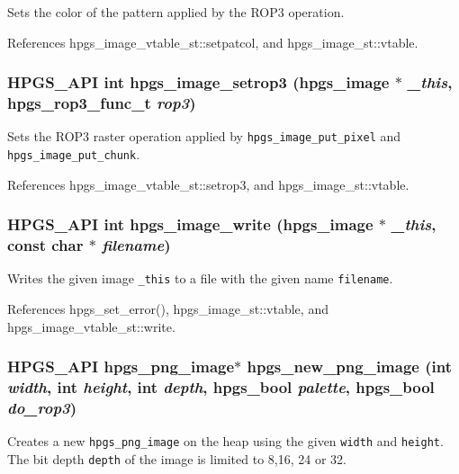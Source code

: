 Sets the color of the pattern applied by the ROP3 operation. 

References hpgs\_\-image\_\-vtable\_\-st::setpatcol, and hpgs\_\-image\_\-st::vtable.
\subsubsection[hpgs\_\-image\_\-setrop3]{\setlength{\rightskip}{0pt plus 5cm}HPGS\_\-API int hpgs\_\-image\_\-setrop3 ({\bf hpgs\_\-image} $\ast$ {\em \_\-this}, \/  hpgs\_\-rop3\_\-func\_\-t {\em rop3})}\label{group__image_g34ad39852d133cb855c6d315c2eb48eb}


Sets the ROP3 raster operation applied by {\tt hpgs\_\-image\_\-put\_\-pixel} and {\tt hpgs\_\-image\_\-put\_\-chunk}. 

References hpgs\_\-image\_\-vtable\_\-st::setrop3, and hpgs\_\-image\_\-st::vtable.
\subsubsection[hpgs\_\-image\_\-write]{\setlength{\rightskip}{0pt plus 5cm}HPGS\_\-API int hpgs\_\-image\_\-write ({\bf hpgs\_\-image} $\ast$ {\em \_\-this}, \/  const char $\ast$ {\em filename})}\label{group__image_g3c87359a79f9da67a3a541cb4cb63c76}


Writes the given image {\tt \_\-this} to a file with the given name {\tt filename}. 

References hpgs\_\-set\_\-error(), hpgs\_\-image\_\-st::vtable, and hpgs\_\-image\_\-vtable\_\-st::write.
\subsubsection[hpgs\_\-new\_\-png\_\-image]{\setlength{\rightskip}{0pt plus 5cm}HPGS\_\-API hpgs\_\-png\_\-image$\ast$ hpgs\_\-new\_\-png\_\-image (int {\em width}, \/  int {\em height}, \/  int {\em depth}, \/  hpgs\_\-bool {\em palette}, \/  hpgs\_\-bool {\em do\_\-rop3})}\label{group__image_g1d4c0fff4731c1f76a4305fc4a6cea74}


Creates a new {\tt hpgs\_\-png\_\-image} on the heap using the given {\tt width} and {\tt height}. The bit depth {\tt depth} of the image is limited to 8,16, 24 or 32.

